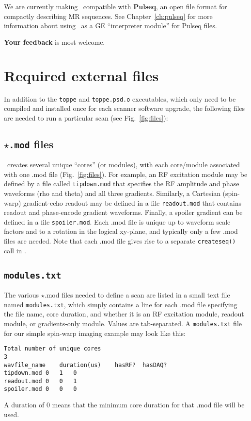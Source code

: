 We are currently making \toppe~compatible with {\bf Pulseq}, an open file format for compactly describing MR sequences.
See Chapter~\ref{ch:pulseq} for more information about using \toppe~as a GE ``interpreter module'' for Pulseq files.

\textbf{Your feedback} is most welcome. 


\section{Required external files}
In addition to the {\tt toppe} and {\tt toppe.psd.o} executables, which only need to be compiled and installed once for each scanner software upgrade, the following files are needed to run a particular scan (see Fig.~\ref{fig:files}):

\subsection{ {\tt $\star$.mod} files}
\toppe~creates several unique ``cores'' (or modules), with each core/module associated with one .mod file (Fig.~\ref{fig:files}).
For example, an RF excitation module may be defined by a file called {\tt tipdown.mod} that specifies the RF amplitude and phase waveforms (rho and theta) and all three gradients.
Similarly, a Cartesian (spin-warp) gradient-echo readout may be defined in a file {\tt readout.mod} that contains readout and phase-encode gradient waveforms.
Finally, a spoiler gradient can be defined in a file {\tt spoiler.mod}.
Each .mod file is unique up to waveform scale factors and to a rotation in the logical xy-plane, and typically only a few .mod files are needed.
Note that each .mod file gives rise to a separate {\tt createseq()} call in \toppe.

\subsection{\tt modules.txt}
The various $\star$.mod files needed to define a scan are listed in a small text file named {\tt modules.txt}, which simply contains a line for each .mod file specifying the file name, core duration, and whether it is an RF excitation module, readout module, or gradients-only module.
Values are tab-separated.
A {\tt modules.txt} file for our simple spin-warp imaging example may look like this:
\begin{lstlisting}
Total number of unique cores
3
wavfile_name	duration(us)	hasRF?	hasDAQ?
tipdown.mod	0	1	0
readout.mod	0	0	1
spoiler.mod	0	0	0
\end{lstlisting}
A duration of 0 means that the minimum core duration for that .mod file will be used.

